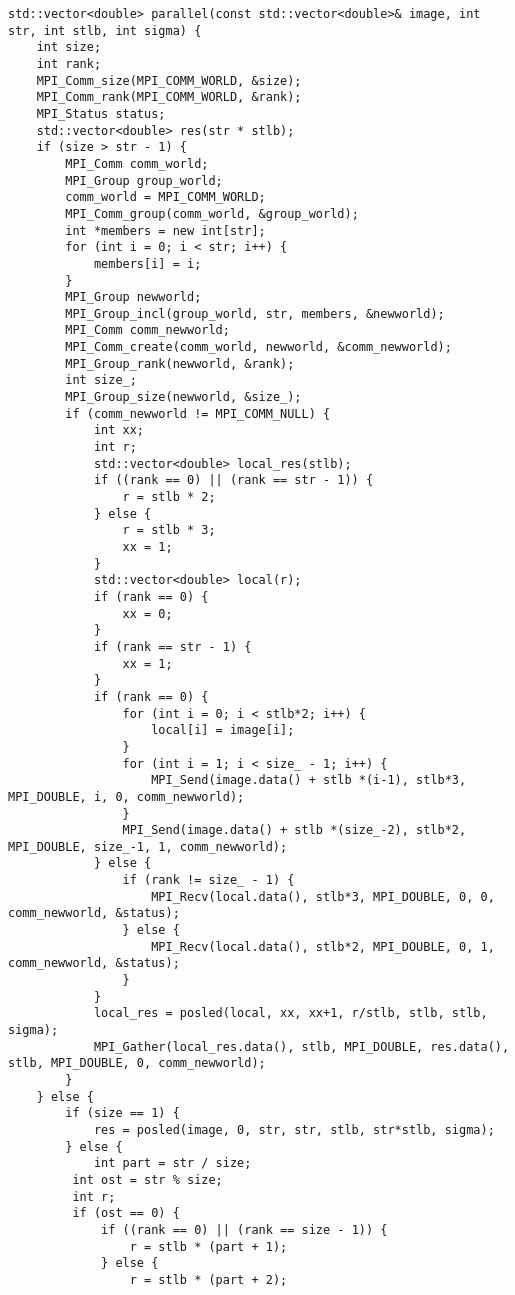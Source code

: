 \documentclass{report}
\begin{document}
\begin{lstlisting}
std::vector<double> parallel(const std::vector<double>& image, int str, int stlb, int sigma) {
    int size;
    int rank;
    MPI_Comm_size(MPI_COMM_WORLD, &size);
    MPI_Comm_rank(MPI_COMM_WORLD, &rank);
    MPI_Status status;
    std::vector<double> res(str * stlb);
    if (size > str - 1) {
        MPI_Comm comm_world;
        MPI_Group group_world;
        comm_world = MPI_COMM_WORLD;
        MPI_Comm_group(comm_world, &group_world);
        int *members = new int[str];
        for (int i = 0; i < str; i++) {
            members[i] = i;
        }
        MPI_Group newworld;
        MPI_Group_incl(group_world, str, members, &newworld);
        MPI_Comm comm_newworld;
        MPI_Comm_create(comm_world, newworld, &comm_newworld);
        MPI_Group_rank(newworld, &rank);
        int size_;
        MPI_Group_size(newworld, &size_);
        if (comm_newworld != MPI_COMM_NULL) {
            int xx;
            int r;
            std::vector<double> local_res(stlb);
            if ((rank == 0) || (rank == str - 1)) {
                r = stlb * 2;
            } else {
                r = stlb * 3;
                xx = 1;
            }
            std::vector<double> local(r);
            if (rank == 0) {
                xx = 0;
            }
            if (rank == str - 1) {
                xx = 1;
            }
            if (rank == 0) {
                for (int i = 0; i < stlb*2; i++) {
                    local[i] = image[i];
                }
                for (int i = 1; i < size_ - 1; i++) {
                    MPI_Send(image.data() + stlb *(i-1), stlb*3, MPI_DOUBLE, i, 0, comm_newworld);
                }
                MPI_Send(image.data() + stlb *(size_-2), stlb*2, MPI_DOUBLE, size_-1, 1, comm_newworld);
            } else {
                if (rank != size_ - 1) {
                    MPI_Recv(local.data(), stlb*3, MPI_DOUBLE, 0, 0, comm_newworld, &status);
                } else {
                    MPI_Recv(local.data(), stlb*2, MPI_DOUBLE, 0, 1, comm_newworld, &status);
                }
            }
            local_res = posled(local, xx, xx+1, r/stlb, stlb, stlb, sigma);
            MPI_Gather(local_res.data(), stlb, MPI_DOUBLE, res.data(), stlb, MPI_DOUBLE, 0, comm_newworld);
        }
    } else {
        if (size == 1) {
            res = posled(image, 0, str, str, stlb, str*stlb, sigma);
        } else {
            int part = str / size;
         int ost = str % size;
         int r;
         if (ost == 0) {
             if ((rank == 0) || (rank == size - 1)) {
                 r = stlb * (part + 1);
             } else {
                 r = stlb * (part + 2);

\end{lstlisting}
\end{document}
